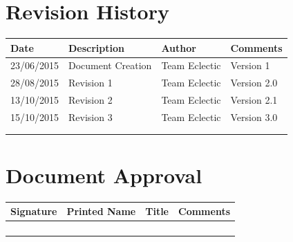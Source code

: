 \documentclass[11pt]{article}
\begin{document}


\setcounter{tocdepth}{3}
\setcounter{secnumdepth}{5}
\tableofcontents

\newpage
\section{Revision History}
\begin{table}[h]
\begin{tabular}{llll}
\textbf{Date}          & \textbf{Description}  & \textbf{Author}       & \textbf{Comments}   \\ \hline
\multicolumn{1}{|R{2cm}|}{23/06/2015} & \multicolumn{1}{L{4.5cm}|}{Document Creation} & \multicolumn{1}{l|}{Team Eclectic} & \multicolumn{1}{L{4cm}|}{Version 1} \\ \hline
\multicolumn{1}{|R{2cm}|}{28/08/2015} & \multicolumn{1}{L{4.5cm}|}{Revision 1} & \multicolumn{1}{l|}{Team Eclectic} & \multicolumn{1}{L{4cm}|}{Version 2.0} \\ \hline
\multicolumn{1}{|R{2cm}|}{13/10/2015} & \multicolumn{1}{L{4.5cm}|}{Revision 2} & \multicolumn{1}{l|}{Team Eclectic} & \multicolumn{1}{L{4cm}|}{Version 2.1} \\ \hline
\multicolumn{1}{|R{2cm}|}{15/10/2015} & \multicolumn{1}{L{4.5cm}|}{Revision 3} & \multicolumn{1}{l|}{Team Eclectic} & \multicolumn{1}{L{4cm}|}{Version 3.0} \\ \hline
\multicolumn{1}{|l|}{} & \multicolumn{1}{l|}{} & \multicolumn{1}{l|}{} & \multicolumn{1}{l|}{} \\ \hline
\multicolumn{1}{|l|}{} & \multicolumn{1}{l|}{} & \multicolumn{1}{l|}{} & \multicolumn{1}{l|}{} \\ \hline
\end{tabular}
\end{table}

\section{Document Approval}
\begin{table}[h]
\begin{tabular}{llll}
\textbf{Signature}     & \textbf{Printed Name} & \textbf{Title}        & \textbf{Comments}     \\ \hline
\multicolumn{1}{|l|}{} & \multicolumn{1}{L{3.5cm}|}{} & \multicolumn{1}{L{3.5cm}|}{} & \multicolumn{1}{L{4cm}|}{} \\ \hline
\multicolumn{1}{|l|}{} & \multicolumn{1}{l|}{} & \multicolumn{1}{l|}{} & \multicolumn{1}{l|}{} \\ \hline
\multicolumn{1}{|l|}{} & \multicolumn{1}{l|}{} & \multicolumn{1}{l|}{} & \multicolumn{1}{l|}{} \\ \hline
\multicolumn{1}{|l|}{} & \multicolumn{1}{l|}{} & \multicolumn{1}{l|}{} & \multicolumn{1}{l|}{} \\ \hline
\end{tabular}
\end{table}
\end{document}
